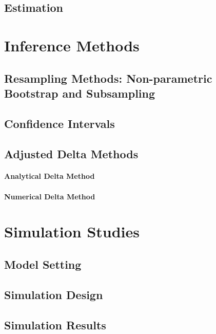 \documentclass[12pt,a4paper,english]{article} %
\numberwithin{equation}{section}
\numberwithin{figure}{section}
\numberwithin{table}{section}
\begin{document}
\subsection{Estimation}

\section{Inference Methods}\label{sec:inference_methods}

\subsection{Resampling Methods: Non-parametric Bootstrap and Subsampling}

\subsection{Confidence Intervals}

\subsection{Adjusted Delta Methods}

\paragraph{Analytical Delta Method}

\paragraph{Numerical Delta Method}

\section{Simulation Studies}\label{sec:simulation_studies}

\subsection{Model Setting}

\subsection{Simulation Design}

\subsection{Simulation Results}
\end{document}
